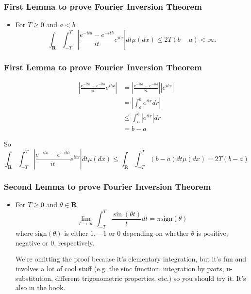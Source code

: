 \documentclass[handout]{beamer}
\begin{document}
\frame
{
  \frametitle{First Lemma to prove Fourier Inversion Theorem} 

 \begin{itemize}
 
  \item<1->[] \begin{Theorem}[Lemma 11.1.2] 
  For $T \ge 0$ and $a < b$
  	$$\int_{\mathbf{R}} \int_{-T}^T \left| \frac{ e^{-ita} - e^{-itb} }{it} e^{itx} \right| dt \mu(dx) \le 2T(b-a) < \infty.$$
   \end{Theorem}
  
 
\end{itemize}
}


\frame
{
  \frametitle{First Lemma to prove Fourier Inversion Theorem} 

\begin{align*}
\left| \frac{ e^{-ita} - e^{-itb} }{it} e^{itx} \right| &= \left| \frac{ e^{-ita} - e^{-itb} }{it}  \right||e^{itx}| \\
&= \left| \int_a^b e^{itr} dr  \right| \\
&\le  \int_a^b |e^{itr}| dr  \\
&= b-a 
\end{align*}

So
$$
\int_{\mathbf{R}} \int_{-T}^T \left| \frac{ e^{-ita} - e^{-itb} }{it} e^{itx} \right| dt \mu(dx) \le \int_{\mathbf{R}} \int_{-T}^T (b-a) dt \mu(dx) = 2T(b-a)
$$

}


\frame
{
  \frametitle{Second Lemma to prove Fourier Inversion Theorem} 

 \begin{itemize}
 
  \item<1->[] \begin{Theorem}[Lemma 11.1.3] 
	For $T \ge 0$ and $\theta \in \mathbf{R}$
	$$
	\lim_{T \to \infty}\int_{-T}^T \frac{\sin(\theta t)}{t}dt = \pi \text{sign}(\theta)
	$$
	where $\text{sign}(\theta)$ is either $1$, $-1$ or $0$ depending on whether $\theta$ is positive, negative or $0$, respectively.
   \end{Theorem}
  
We're omitting the proof because it's elementary integration, but it's fun and involves a lot of cool stuff (e.g. the sinc function, integration by parts, u-substitution, different trigonometric properties, etc.) so you should try it. It's also in the book.
\end{itemize}
}
\end{document}
